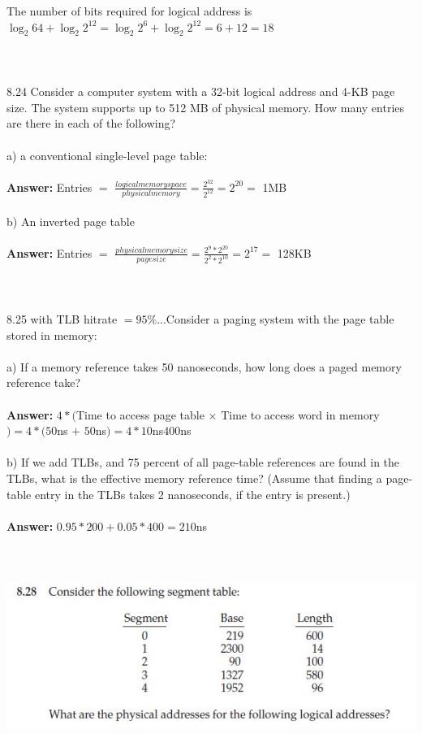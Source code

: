 \documentclass[12pt]{article}
\begin{document}
The number of bits required for logical address is $\log_2{64} + 
\log_2{2^{12}} = \log_2{2^6} + \log_2{2^{12}} = 6 + 12 = 18$
\\\\
\\\\8.24 Consider a computer system with a 32-bit logical address and 4-KB page
size. The system supports up to 512 MB of physical memory. How many
entries are there in each of the following?\\\\
a) a conventional single-level page table: \\\\
\textbf{Answer: } Entries $=$ $\frac{logical memory space}{physical memory} 
= \frac{2^{32}}{2^{12}} = 2^{20} =$ 1MB \\\\
b) An inverted page table\\\\
\textbf{Answer: } Entries $=$ $\frac{physical memory size}{page size} = 
\frac{2^9*2^{20}}{2^2*2^{10}}=2^{17} = $ 128KB
\\\\
\\\\8.25 with TLB hitrate $= 95\%$...Consider a paging system 
with the page table stored in memory:\\\\
a) If a memory reference takes 50 nanoseconds, how long does a
paged memory reference take?\\\\
\textbf{Answer: } $4*($Time to access page table $\times$ Time to access word in memory$) = 
4*(50$ns $+$ $50$ns$) = 4*10$ns$400$ns\\\\
b) If we add TLBs, and 75 percent of all page-table references are found
in the TLBs, what is the effective memory reference time? (Assume
that finding a page-table entry in the TLBs takes 2 nanoseconds, if
the entry is present.)\\\\
\textbf{Answer: } $0.95*200+0.05*400=210$ns
\\\\
\\\\\includegraphics[scale = 1]{28.jpg}\\
\end{document}
